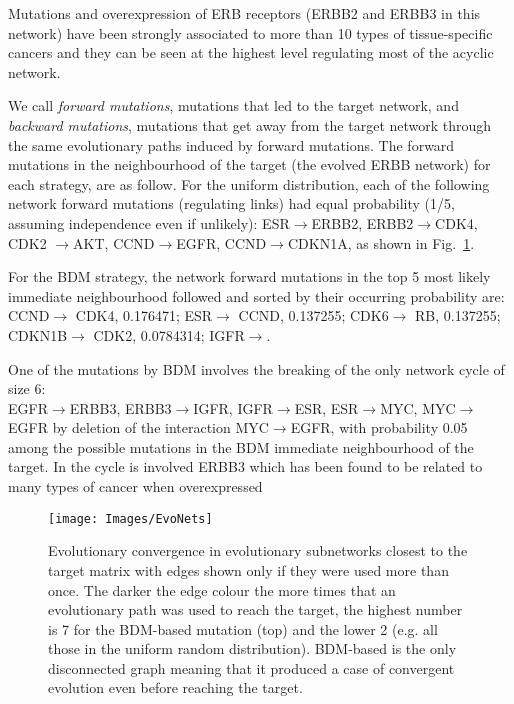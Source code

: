 \documentclass[10pt]{article}
\begin{document}
Mutations and overexpression of ERB receptors (ERBB2 and ERBB3 in this network) have been strongly associated to more than 10 types of tissue-specific cancers and they can be seen at the highest level regulating most of the acyclic network. 

We call \textit{forward mutations}, mutations that led to the target network, and \textit{backward mutations}, mutations that get away from the target network through the same evolutionary paths induced by forward mutations. The forward mutations in the neighbourhood of the target (the evolved ERBB network) for each strategy, are as follow. For the uniform distribution, each of the following network forward mutations (regulating links) had equal probability (1/5, assuming independence even if unlikely): ESR$\rightarrow$ERBB2,  ERBB2$\rightarrow$CDK4, CDK2 $\rightarrow$AKT,  CCND$\rightarrow$EGFR,  CCND$\rightarrow$CDKN1A, as shown in Fig.~\ref{evonetsfig}.

For the BDM strategy, the network forward mutations in the top 5 most likely immediate neighbourhood followed and sorted by their occurring probability are: CCND$\rightarrow$ CDK4, 0.176471; ESR$\rightarrow$ 
   CCND, 0.137255; CDK6$\rightarrow$ 
   RB, 0.137255; CDKN1B$\rightarrow$ 
   CDK2, 0.0784314; IGFR$\rightarrow$. 

One of the mutations by BDM involves the breaking of the only network cycle of size 6:\\ EGFR$\rightarrow$ERBB3, ERBB3$\rightarrow$IGFR, IGFR$\rightarrow$ESR, ESR$\rightarrow$MYC, MYC$\rightarrow$EGFR by deletion of the interaction MYC$\rightarrow$EGFR, with probability 0.05 among the possible mutations in the BDM immediate neighbourhood of the target. In the cycle is involved ERBB3 which has been found to be related to many types of cancer when overexpressed~\cite{erbb}

\begin{figure}[ht!]
    \centering
    \texttt{[image: Images/EvoNets]}
    \caption{Evolutionary convergence in evolutionary subnetworks closest to the target matrix with edges shown only if they were used more than once. The darker the edge colour the more times that an evolutionary path was used to reach the target, the highest number is 7 for the BDM-based mutation (top) and the lower 2 (e.g. all those in the uniform random distribution). BDM-based is the only disconnected graph meaning that it produced a case of convergent evolution even before reaching the target.
        \label{evonetsfig}}
\end{figure}
\end{document}
